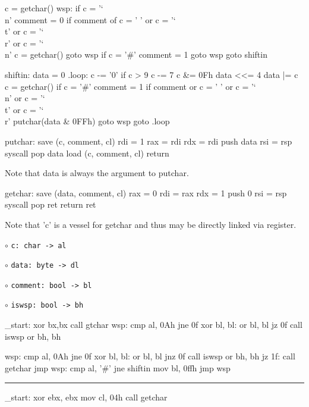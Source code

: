 \code
	c = getchar()\cr
	wsp:\cr
	if c = '\char`\\n'\cr
	\qquad comment = 0\cr
	if comment of c = ' ' or\cr
	c = '\char`\\t' or c = '\char`\\r' or\cr
	c = '\char`\\n'\cr
	\qquad c = getchar()\cr
	\qquad goto wsp
	if c = '\#'\cr
	\qquad comment = 1\cr
	\qquad goto wsp\cr
	goto shiftin\cr
\ecode
\page

\code
	shiftin:\cr
	data = 0\cr
	.loop:\cr
	c -= '0'\cr
	if c > 9\cr
	\qquad c -= 7\cr
	c \&= 0Fh\cr
	data <<= 4\cr
	data |= c\cr
	c = getchar()\cr
	if c = '\#'\cr
	\qquad comment = 1\cr
	if comment or c = ' '\cr
	or c = '\char`\\n' or c = '\char`\\t'\cr
	or c = '\char`\\r'\cr
	\qquad putchar(data \& 0FFh)\cr
	\qquad goto wsp\cr
	goto .loop\cr
\ecode
\page

\vfil\break

\null\vfil

\code
	putchar:\cr
	save (c, comment, cl)\cr
	rdi = 1\cr
	rax = rdi\cr
	rdx = rdi\cr
	push data\cr
	rsi = rsp\cr
	syscall\cr
	pop data\cr
	load (c, comment, cl)\cr
	return\cr
\ecode

\noindent Note that data is always the argument to putchar.
\page

\code
	getchar:\cr
	save (data, comment, cl)\cr
	rax = 0\cr
	rdi = rax\cr
	rdx = 1\cr
	push 0\cr
	rsi = rsp\cr
	syscall\cr
	pop ret\cr
	return ret\cr
\ecode

\noindent Note that 'c' is a vessel for getchar and thus may be directly linked
via register.
\page

\vfil\break

\null\vfil

\item{$\circ$} {\tt c: char -> al}
\item{$\circ$} {\tt data: byte -> dl}
\item{$\circ$} {\tt comment: bool -> bl}
\item{$\circ$} {\tt iswsp: bool -> bh}

\code
	\_start:\cr
	\qquad xor bx,bx\cr
	\qquad call gtchar\cr
	wsp:\cr
	\qquad cmp al, 0Ah\cr
	\qquad jne 0f\cr
	\qquad xor bl, bl:\cr
	\qquad or bl, bl\cr
	\qquad jz 0f\cr
	\qquad call iswsp\cr
	\qquad or bh, bh\cr
\ecode
\page

\code
	wsp:\cr
	\qquad cmp al, 0Ah\cr
	\qquad jne 0f\cr
	\qquad xor bl, bl:\cr
	\qquad or bl, bl\cr
	\qquad jnz 0f\cr
	\qquad call iswsp\cr
	\qquad or bh, bh\cr
	\qquad jz 1f:\cr
	\qquad call getchar\cr
	\qquad jmp wsp:\cr
	\qquad cmp al, '\#'\cr
	\qquad jne shiftin\cr
	\qquad mov bl, 0ffh\cr
	\qquad jmp wsp\cr
\ecode
\smallskip
\hrule
\smallskip
\code
	\_start:\cr
	\qquad xor ebx, ebx\cr
	\qquad mov cl, 04h\cr
	\qquad call getchar\cr
\ecode
\page

